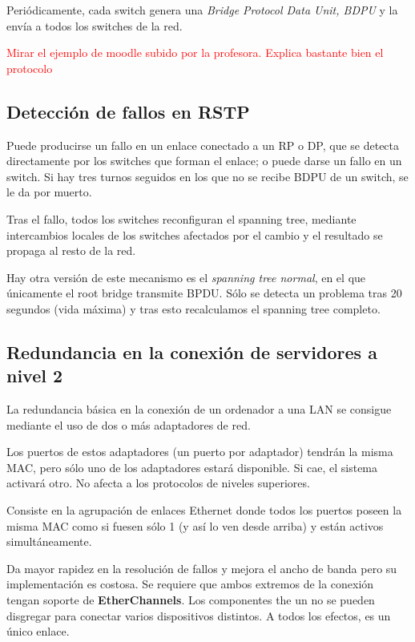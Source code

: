 \documentclass{apuntes}[nochap]
\newcounter{problem}
\begin{document}
Periódicamente, cada switch genera una \textit{Bridge Protocol Data Unit, BDPU} y la envía a todos los switches de la red.

\textcolor{red}{Mirar el ejemplo de moodle subido por la profesora. Explica bastante bien el protocolo}

\subsection{Detección de fallos en RSTP}
Puede producirse un fallo en un enlace conectado a un RP o DP, que se detecta directamente por los switches que forman el enlace; o puede darse un fallo en un switch. Si hay tres turnos seguidos en los que no se recibe BDPU de un switch, se le da por muerto.

Tras el fallo, todos los switches reconfiguran el spanning tree, mediante intercambios locales de los switches afectados por el cambio y el resultado se propaga al resto de la red.

\obs Hay otra versión de este mecanismo es el \textit{spanning tree normal}, en el que únicamente el root bridge transmite BPDU. Sólo se detecta un problema tras 20 segundos (vida máxima) y tras esto recalculamos el spanning tree completo.

\subsection{Redundancia en la conexión de servidores a nivel 2}
La redundancia básica en la conexión de un ordenador a una LAN se consigue mediante el uso de dos o más adaptadores de red.

Los puertos de estos adaptadores (un puerto por adaptador) tendrán la misma MAC, pero sólo uno de los adaptadores estará disponible. Si cae, el sistema activará otro. No afecta a los protocolos de niveles superiores.

\begin{defn}[EtherChannels]
Consiste en la agrupación de enlaces Ethernet donde todos los puertos poseen la misma MAC como si fuesen sólo 1 (y así lo ven desde arriba) y están activos simultáneamente.

Da mayor rapidez en la resolución de fallos y mejora el ancho de banda pero su implementación es costosa. Se requiere que ambos extremos de la conexión tengan soporte de \textbf{EtherChannels}. Los componentes the un  no se pueden disgregar para conectar varios dispositivos distintos. A todos los efectos, es un único enlace.

\end{defn}
\end{document}
